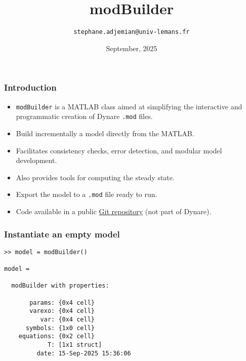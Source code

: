 \documentclass[10pt,slidestop]{beamer}
\theoremstyle{plain}
\begin{document}
\title{modBuilder}
\author[]{\texttt{stephane.adjemian@univ-lemans.fr}}
\date{September,  2025}

\begin{frame}
  \titlepage{}
\end{frame}

\begin{frame}[fragile]
  \frametitle{Introduction}

  \bigskip

  \begin{itemize}

  \item \verb+modBuilder+ is a MATLAB class aimed at simplifying the interactive and
    programmatic creation of Dynare \verb+.mod+ files.\newline

  \item Build incrementally a model directly from the MATLAB.\newline

  \item Facilitates consistency checks, error detection, and modular
    model development.\newline

  \item Also provides tools for computing the steady state.\newline

  \item Export the model to a \verb+.mod+ file ready to run.\newline

  \item Code available in a public \href{https://git.dynare.org/stepan-a/modbuilder}{Git repository} (not part of Dynare).

  \end{itemize}

\end{frame}


\begin{frame}[fragile]
  \frametitle{Instantiate an empty model}

\begin{lstlisting}[style=MatlabConsole]
>> model = modBuilder()

model =

  modBuilder with properties:

       params: {0x4 cell}
       varexo: {0x4 cell}
          var: {0x4 cell}
      symbols: {1x0 cell}
    equations: {0x2 cell}
            T: [1x1 struct]
         date: 15-Sep-2025 15:36:06
   \end{lstlisting}

\end{frame}
\end{document}
